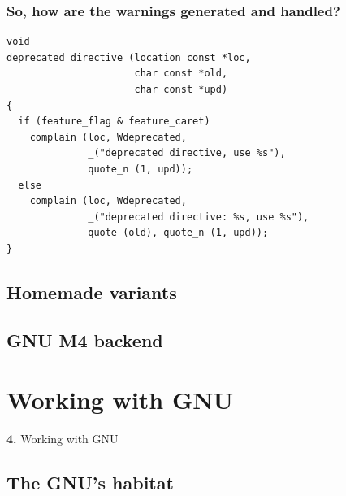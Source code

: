 \documentclass{beamer}
\begin{document}
\begin{frame}[fragile,shrink=25]
  \frametitle{So, how are the warnings generated and handled?}
\begin{verbatim}
void
deprecated_directive (location const *loc,
                      char const *old,
                      char const *upd)
{
  if (feature_flag & feature_caret)
    complain (loc, Wdeprecated,
              _("deprecated directive, use %s"),
              quote_n (1, upd));
  else
    complain (loc, Wdeprecated,
              _("deprecated directive: %s, use %s"),
              quote (old), quote_n (1, upd));
}
\end{verbatim}
\end{frame}


\subsection{Homemade variants}
\subsection{GNU M4 backend}

\begin{frame}
\end{frame}

\section{Working with GNU}

\begingroup
{}
\begin{frame}
    \begin{center}
        \vspace{1cm}
        {\Huge\color{black} \textbf{4.} { Working with GNU}}
    \end{center}
\end{frame}
\endgroup

\subsection{The GNU's habitat}
\end{document}
